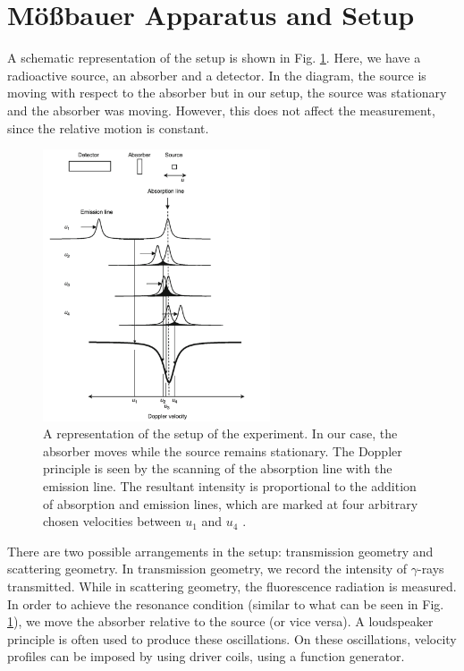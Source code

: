 \documentclass[a4paper]{report}
\numberwithin{equation}{section}
\begin{document}
\section{M\"o{\ss}bauer Apparatus and Setup}

A schematic representation of the setup is shown in Fig. \ref{fig:setup}. Here, we have a radioactive source, an absorber and a detector. In the diagram, the source is moving with respect to the absorber but in our setup, the source was stationary and the absorber was moving. However, this does not affect the measurement, since the relative motion is constant. 

\begin{figure}[htpb]
    \centering
    \includegraphics[width=0.6\textwidth]{setup}
	\caption{A representation of the setup of the experiment. In our case, the absorber moves while the source remains stationary. The Doppler principle is seen by the scanning of the absorption line with the emission line. The resultant intensity is proportional to the addition of absorption and emission lines, which are marked at four arbitrary chosen velocities between $u_{1}$ and $u_{4}$ \cite{Kuzmann2011}.}
    \label{fig:setup}
\end{figure}

There are two possible arrangements in the setup: transmission geometry and scattering geometry. In  transmission geometry, we record the intensity of $\gamma$-rays transmitted. While in scattering geometry, the fluorescence radiation is measured. In order to achieve the resonance condition (similar to what can be seen in Fig. \ref{fig:setup}), we move the absorber relative to the source (or vice versa). A loudspeaker principle is often used to produce these oscillations. On these oscillations, velocity profiles can be imposed by using driver coils, using a function generator. 
\end{document}
